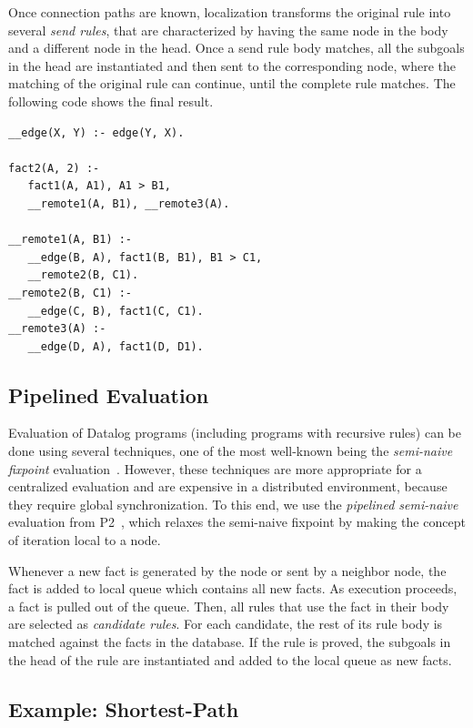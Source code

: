 \documentclass[preprint]{sigplanconf}
\begin{document}
Once connection paths are known, localization transforms the original rule into several
\emph{send rules}, that are characterized by having the same node in the body and a different
node in the head. Once a send rule body matches,
all the subgoals in the head are instantiated and then sent to the corresponding node,
where the matching of the original rule can continue, until the complete rule matches.
The following code shows the final result.

\begin{verbatim}
__edge(X, Y) :- edge(Y, X).

fact2(A, 2) :-
   fact1(A, A1), A1 > B1,
   __remote1(A, B1), __remote3(A).
   
__remote1(A, B1) :-
   __edge(B, A), fact1(B, B1), B1 > C1,
   __remote2(B, C1).
__remote2(B, C1) :-
   __edge(C, B), fact1(C, C1).
__remote3(A) :-
   __edge(D, A), fact1(D, D1).
\end{verbatim}

\subsection{Pipelined Evaluation}

Evaluation of Datalog programs (including programs with recursive rules) can be done using
several techniques, one of the most well-known being the \emph{semi-naive fixpoint}
evaluation~\cite{Balbin1987259, Bancilhon:1986:NER:8789.8804}. However, these techniques
are more appropriate for a centralized evaluation and are expensive in a distributed environment,
because they require global synchronization. To this end, we use the \emph{pipelined semi-naive}
evaluation from P2~\cite{Loo-condie-garofalakis-p2}, which relaxes the semi-naive fixpoint
by making the concept of iteration local to a node.

Whenever a new fact is generated by the node or sent by a neighbor node, the fact is added to local
queue which contains all new facts. As execution proceeds, a fact is pulled out of the queue. Then,
all rules that use the fact in their body are selected as \emph{candidate rules}. For each candidate, the
rest of its rule body is matched against the facts in the database. If the rule is proved, the subgoals
in the head of the rule are instantiated and added to the local queue as new facts.

\subsection{Example: Shortest-Path}
\end{document}
